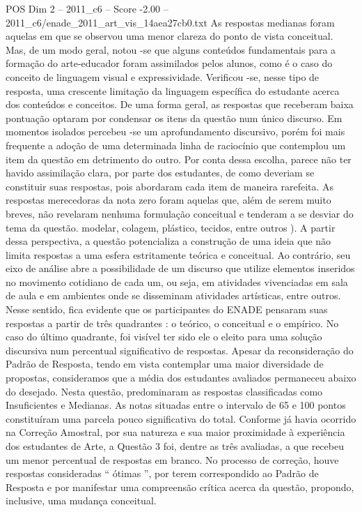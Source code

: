 \begin{textsample}{POS Dim 2 – 2011\_c6 – Score -2.00 – 2011\_c6/enade\_2011\_art\_vis\_14aea27cb0.txt}
As respostas medianas foram aquelas em que se observou uma menor clareza do ponto de vista conceitual.
Mas, de um modo geral, notou -se que alguns conteúdos fundamentais para a formação do arte-educador foram assimilados pelos alunos, como é o caso do conceito de linguagem visual e expressividade.
Verificou -se, nesse tipo de resposta, uma crescente limitação da linguagem específica do estudante acerca dos conteúdos e conceitos.
De uma forma geral, as respostas que receberam baixa pontuação optaram por condensar os itens da questão num único discurso.
Em momentos isolados percebeu -se um aprofundamento discursivo, porém foi mais frequente a adoção de uma determinada linha de raciocínio que contemplou um item da questão em detrimento do outro.
Por conta dessa escolha, parece não ter havido assimilação clara, por parte dos estudantes, de como deveriam se constituir suas respostas, pois abordaram cada item de maneira rarefeita.
As respostas merecedoras da nota zero foram aquelas que, além de serem muito breves, não revelaram nenhuma formulação conceitual e tenderam a se desviar do tema da questão. modelar, colagem, plástico, tecidos, entre outros ).
A partir dessa perspectiva, a questão potencializa a construção de uma ideia que não limita respostas a uma esfera estritamente teórica e conceitual.
Ao contrário, seu eixo de análise abre a possibilidade de um discurso que utilize elementos inseridos no movimento cotidiano de cada um, ou seja, em atividades vivenciadas em sala de aula e em ambientes onde se disseminam atividades artísticas, entre outros.
Nesse sentido, fica evidente que os participantes do ENADE pensaram suas respostas a partir de três quadrantes : o teórico, o conceitual e o empírico.
No caso do último quadrante, foi visível ter sido ele o eleito para uma solução discursiva num percentual significativo de respostas.
Apesar da reconsideração do Padrão de Resposta, tendo em vista contemplar uma maior diversidade de propostas, consideramos que a média dos estudantes avaliados permaneceu abaixo do desejado.
Nesta questão, predominaram as respostas classificadas como Insuficientes e Medianas.
As notas situadas entre o intervalo de 65 e 100 pontos constituíram uma parcela pouco significativa do total.
Conforme já havia ocorrido na Correção Amostral, por sua natureza e sua maior proximidade à experiência dos estudantes de Arte, a Questão 3 foi, dentre as três avaliadas, a que recebeu um menor percentual de respostas em branco.
No processo de correção, houve respostas consideradas “ ótimas ”, por terem correspondido ao Padrão de Resposta e por manifestar uma compreensão crítica acerca da questão, propondo, inclusive, uma mudança conceitual.

\end{textsample}
